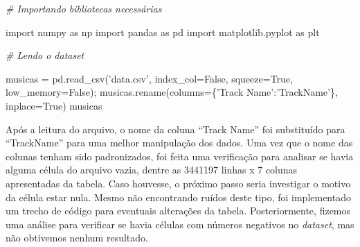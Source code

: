 \documentclass[11pt]{article}
\newenvironment{Shaded}{}{}
\newcommand{\StringTok}[1]{\textcolor[rgb]{0.25,0.44,0.63}{{#1}}}
\newcommand{\CommentTok}[1]{\textcolor[rgb]{0.38,0.63,0.69}{\textit{{#1}}}}
\newcommand{\NormalTok}[1]{{#1}}
\newcommand{\ImportTok}[1]{{#1}}
\newcommand{\VariableTok}[1]{\textcolor[rgb]{0.10,0.09,0.49}{{#1}}}
\newcommand{\OperatorTok}[1]{\textcolor[rgb]{0.40,0.40,0.40}{{#1}}}
\begin{document}
    \begin{Shaded}
\begin{Highlighting}[]
    \CommentTok{# Importando bibliotecas necessárias}

\ImportTok{import}\NormalTok{ numpy }\ImportTok{as}\NormalTok{ np}
\ImportTok{import}\NormalTok{ pandas }\ImportTok{as}\NormalTok{ pd}
\ImportTok{import}\NormalTok{ matplotlib.pyplot }\ImportTok{as}\NormalTok{ plt}
\end{Highlighting}
\end{Shaded}

    \begin{Shaded}
\begin{Highlighting}[]
    \CommentTok{# Lendo o dataset}

\NormalTok{musicas }\OperatorTok{=}\NormalTok{ pd.read_csv(}\StringTok{'data.csv'}\NormalTok{, index_col}\OperatorTok{=}\VariableTok{False}\NormalTok{, squeeze}\OperatorTok{=}\VariableTok{True}\NormalTok{, low_memory}\OperatorTok{=}\VariableTok{False}\NormalTok{)}\OperatorTok{;}
\NormalTok{musicas.rename(columns}\OperatorTok{=}\NormalTok{\{}\StringTok{'Track Name'}\NormalTok{:}\StringTok{'TrackName'}\NormalTok{\}, inplace}\OperatorTok{=}\VariableTok{True}\NormalTok{)}
\NormalTok{musicas}
\end{Highlighting}
\end{Shaded}

    Após a leitura do arquivo, o nome da coluna ``Track Name'' foi
substituído para ``TrackName'' para uma melhor manipulação dos dados.
Uma vez que o nome das colunas tenham sido padronizados, foi feita uma
verificação para analisar se havia alguma célula do arquivo vazia,
dentre as 3441197 linhas x 7 colunas apresentadas da tabela. Caso
houvesse, o próximo passo seria investigar o motivo da célula estar
nula. Mesmo não encontrando ruídos deste tipo, foi implementado um
trecho de código para eventuais alterações da tabela. Posteriormente,
fizemos uma análise para verificar se havia células com números
negativos no \emph{dataset}, mas não obtivemos nenhum resultado.
\end{document}
